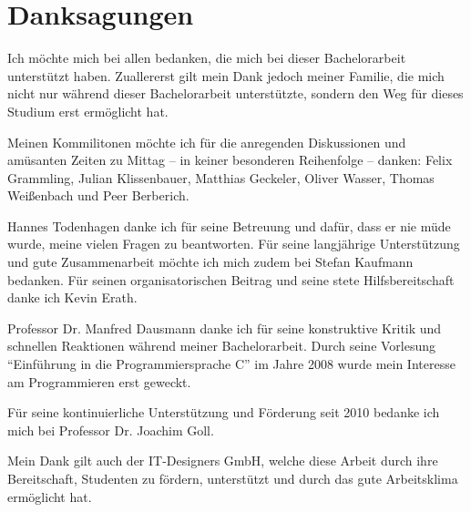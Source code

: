 
\chapter*{Danksagungen}

Ich möchte mich bei allen bedanken, die mich bei dieser Bachelorarbeit unterstützt haben.
Zuallererst gilt mein Dank jedoch meiner Familie, die mich nicht nur während dieser Bachelorarbeit unterstützte, sondern den Weg für dieses Studium erst ermöglicht hat.

Meinen Kommilitonen möchte ich für die anregenden Diskussionen und amüsanten Zeiten zu Mittag -- in keiner besonderen Reihenfolge -- danken:
Felix Grammling,
Julian Klissenbauer,
Matthias Geckeler,
Oliver Wasser,
Thomas Weißenbach und
Peer Berberich.



Hannes Todenhagen danke ich für seine Betreuung und dafür, dass er nie müde wurde, meine vielen Fragen zu beantworten.
Für seine langjährige Unterstützung und gute Zusammenarbeit möchte ich mich zudem bei Stefan Kaufmann bedanken.
Für seinen organisatorischen Beitrag und seine stete Hilfsbereitschaft danke ich Kevin Erath.

Professor Dr. Manfred Dausmann danke ich für seine konstruktive Kritik und schnellen Reaktionen während meiner Bachelorarbeit. Durch seine Vorlesung \enquote{Einführung in die Programmiersprache C} im Jahre 2008 wurde mein Interesse am Programmieren erst geweckt.


Für seine kontinuierliche Unterstützung und Förderung seit 2010 bedanke ich mich bei Professor Dr. Joachim Goll.

Mein Dank gilt auch der IT-Designers GmbH, welche diese Arbeit durch ihre Bereitschaft, Studenten zu fördern, unterstützt und durch das gute Arbeitsklima ermöglicht hat.
